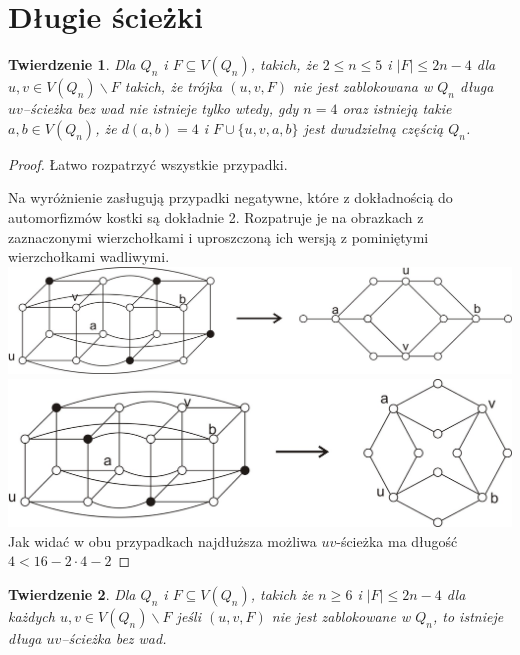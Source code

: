 \documentclass{pracamgr}
\newtheorem{theorem}{Twierdzenie}[chapter]
\begin{document}
  \section{Długie ścieżki}
   \begin{theorem}\label{tw o dlugich sciezkach, male n}
    Dla $Q_n$ i $F\subseteq V(Q_n)$, takich, że $2\le n \le 5$ i $|F|\le 2n-4$ dla $u,v\in V(Q_n)\backslash F$ takich, że trójka $(u,v,F)$
    nie jest zablokowana  w $Q_n$ długa $uv$--ścieżka bez wad nie istnieje tylko wtedy, gdy $n=4$ oraz istnieją takie $a,b\in V(Q_n)$,
    że $d(a,b)=4$  i $F\cup\{u,v,a,b\}$  jest dwudzielną częścią $Q_n$.
   \end{theorem}
   \begin{proof}
    Łatwo rozpatrzyć wszystkie przypadki.
    
    Na wyróżnienie zasługują przypadki negatywne, które z dokładnością do automorfizmów kostki są dokładnie 2.
    Rozpatruje je na obrazkach z zaznaczonymi wierzchołkami i uproszczoną ich wersją z pominiętymi wierzchołkami wadliwymi.\newline
    \hspace*{100pt}\includegraphics[scale=0.7]{img/Q_4_niezablokowane_1.jpg}\newline
    \hspace*{100pt}\includegraphics[scale=0.7]{img/Q_4_niezablokowane_2.jpg}\newline
    Jak widać w obu przypadkach najdłuższa możliwa $uv$-ścieżka ma długość $4<16-2\cdot4-2$
   \end{proof}
   \begin{theorem}\label{tw o dlugich sciezkach}
    Dla $Q_n$ i $F\subseteq V(Q_n)$, takich  że  $n\ge 6$ i $|F|\le 2n-4$ dla każdych $u,v\in V(Q_n)\backslash F$ jeśli $(u,v,F)$ nie jest zablokowane w $Q_n$,
    to istnieje długa $uv$--ścieżka bez wad.
   \end{theorem}
\end{document}
